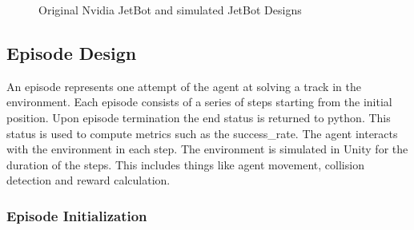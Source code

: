 \begin{figure}
    \centering
    \qquad
    \qquad
    \qquad
    \caption{Original Nvidia JetBot and simulated JetBot Designs}
    \label{fig:jetbots}
\end{figure}


\subsection{Episode Design}

An episode represents one attempt of the agent at solving a track in the environment. Each episode consists of a series of steps starting from the initial position. Upon episode termination the end status is returned to python. This status is used to compute metrics such as the success\_rate. The agent interacts with the environment in each step. The environment is simulated in Unity for the duration of the steps. This includes things like agent movement, collision detection and reward calculation.

\subsubsection{Episode Initialization}

